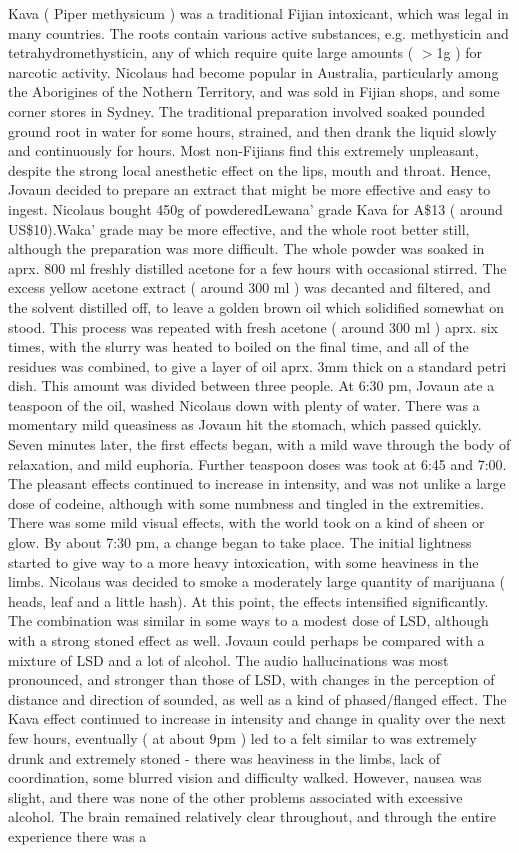 \documentclass[12pt]{book}
\begin{document}
Kava ( Piper methysicum ) was a traditional Fijian intoxicant, which was legal in many countries. The roots contain various active substances, e.g. methysticin and tetrahydromethysticin, any of which require quite large amounts ( $>$1g ) for narcotic activity. Nicolaus had become popular in Australia, particularly among the Aborigines of the Nothern Territory, and was sold in Fijian shops, and some corner stores in Sydney. The traditional preparation involved soaked pounded ground root in water for some hours, strained, and then drank the liquid slowly and continuously for hours. Most non-Fijians find this extremely unpleasant, despite the strong local anesthetic effect on the lips, mouth and throat. Hence, Jovaun decided to prepare an extract that might be more effective and easy to ingest. Nicolaus bought 450g of powderedLewana' grade Kava for A\$13 ( around US\$10).Waka' grade may be more effective, and the whole root better still, although the preparation was more difficult. The whole powder was soaked in aprx. 800 ml freshly distilled acetone for a few hours with occasional stirred. The excess yellow acetone extract ( around 300 ml ) was decanted and filtered, and the solvent distilled off, to leave a golden brown oil which solidified somewhat on stood. This process was repeated with fresh acetone ( around 300 ml ) aprx. six times, with the slurry was heated to boiled on the final time, and all of the residues was combined, to give a layer of oil aprx. 3mm thick on a standard petri dish. This amount was divided between three people. At 6:30 pm, Jovaun ate a teaspoon of the oil, washed Nicolaus down with plenty of water. There was a momentary mild queasiness as Jovaun hit the stomach, which passed quickly. Seven minutes later, the first effects began, with a mild wave through the body of relaxation, and mild euphoria. Further teaspoon doses was took at 6:45 and 7:00. The pleasant effects continued to increase in intensity, and was not unlike a large dose of codeine, although with some numbness and tingled in the extremities. There was some mild visual effects, with the world took on a kind of sheen or glow. By about 7:30 pm, a change began to take place. The initial lightness started to give way to a more heavy intoxication, with some heaviness in the limbs. Nicolaus was decided to smoke a moderately large quantity of marijuana ( heads, leaf and a little hash). At this point, the effects intensified significantly. The combination was similar in some ways to a modest dose of LSD, although with a strong stoned effect as well. Jovaun could perhaps be compared with a mixture of LSD and a lot of alcohol. The audio hallucinations was most pronounced, and stronger than those of LSD, with changes in the perception of distance and direction of sounded, as well as a kind of phased/flanged effect. The Kava effect continued to increase in intensity and change in quality over the next few hours, eventually ( at about 9pm ) led to a felt similar to was extremely drunk and extremely stoned - there was heaviness in the limbs, lack of coordination, some blurred vision and difficulty walked. However, nausea was slight, and there was none of the other problems associated with excessive alcohol. The brain remained relatively clear throughout, and through the entire experience there was a 
\end{document}
